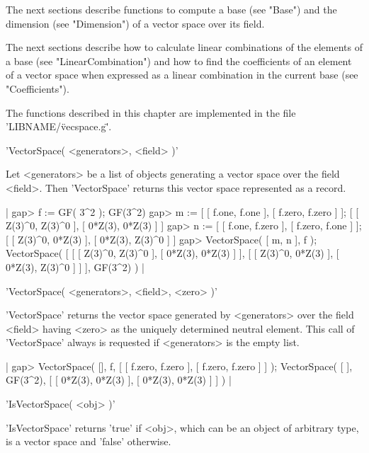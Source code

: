 The next sections  describe functions to compute a base  (see "Base") and
the dimension (see "Dimension") of a vector space over its field.

The  next sections describe  how to calculate linear combinations  of the
elements  of  a  base  (see  "LinearCombination")  and how  to  find  the
coefficients of  an element of a vector space when expressed  as a linear
combination in the current base (see "Coefficients").

The functions described  in  this  chapter  are implemented  in the  file
'LIBNAME/\"vecspace.g\"'.



'VectorSpace( <generators>, <field> )'

Let <generators> be a list of objects generating a vector space  over the
field <field>. Then 'VectorSpace'  returns this  vector space represented
as a {\GAP} record.

|    gap> f := GF( 3^2 );
    GF(3^2)
    gap> m := [ [ f.one, f.one ], [ f.zero, f.zero ] ];
    [ [ Z(3)^0, Z(3)^0 ], [ 0*Z(3), 0*Z(3) ] ]
    gap> n := [ [ f.one, f.zero ], [ f.zero, f.one ] ];
    [ [ Z(3)^0, 0*Z(3) ], [ 0*Z(3), Z(3)^0 ] ]
    gap> VectorSpace( [ m, n ], f );
    VectorSpace( [ [ [ Z(3)^0, Z(3)^0 ], [ 0*Z(3), 0*Z(3) ] ], 
      [ [ Z(3)^0, 0*Z(3) ], [ 0*Z(3), Z(3)^0 ] ] ], GF(3^2) ) |

\vspace{5mm}
'VectorSpace( <generators>, <field>, <zero> )'

'VectorSpace' returns the vector space generated by <generators> over the
field <field> having <zero> as  the uniquely determined  neutral element.
This call  of  'VectorSpace' always is  requested if <generators> is  the
empty list.

|    gap> VectorSpace( [], f, [ [ f.zero, f.zero ], [ f.zero, f.zero ] ] );
    VectorSpace( [  ], GF(3^2), [ [ 0*Z(3), 0*Z(3) ], [ 0*Z(3), 0*Z(3) ]
     ] ) |



'IsVectorSpace( <obj> )'

'IsVectorSpace' returns  'true'  if  <obj>, which  can  be  an object  of
arbitrary type, is a vector space and 'false' otherwise.



